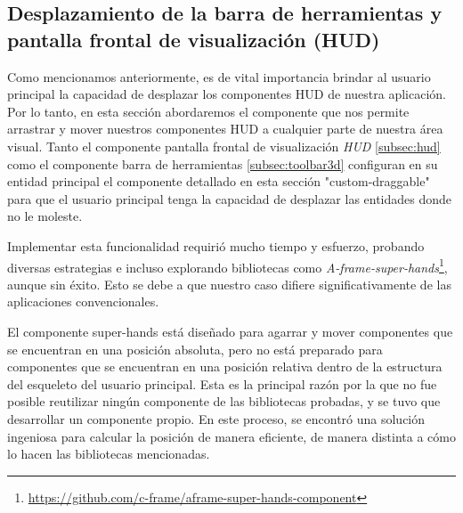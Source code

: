 \documentclass[a4paper, 11pt]{book}
\begin{document}
\subsection{Desplazamiento de la barra de herramientas y pantalla frontal de visualización (HUD)}
\label{subsec:customDraggable}
Como mencionamos anteriormente, es de vital importancia brindar al usuario principal la capacidad de desplazar los componentes HUD de nuestra aplicación. Por lo tanto, en esta sección abordaremos el componente que nos permite arrastrar y mover nuestros componentes HUD a cualquier parte de nuestra área visual.
Tanto el componente pantalla frontal de visualización \emph{HUD} \ref{subsec:hud} como el componente barra de herramientas \ref{subsec:toolbar3d} configuran en su entidad principal el componente detallado en esta sección "custom-draggable" para que el usuario principal tenga la capacidad de desplazar las entidades donde no le moleste.

Implementar esta funcionalidad requirió mucho tiempo y esfuerzo, probando diversas estrategias e incluso explorando bibliotecas como \emph{A-frame-super-hands}\footnote{\url{https://github.com/c-frame/aframe-super-hands-component}}, aunque sin éxito. Esto se debe a que nuestro caso difiere significativamente de las aplicaciones convencionales.

El componente super-hands está diseñado para agarrar y mover componentes que se encuentran en una posición absoluta, pero no está preparado para componentes que se encuentran en una posición relativa dentro de la estructura del esqueleto del usuario principal. Esta es la principal razón por la que no fue posible reutilizar ningún componente de las bibliotecas probadas, y se tuvo que desarrollar un componente propio. En este proceso, se encontró una solución ingeniosa para calcular la posición de manera eficiente, de manera distinta a cómo lo hacen las bibliotecas mencionadas. 
\end{document}
